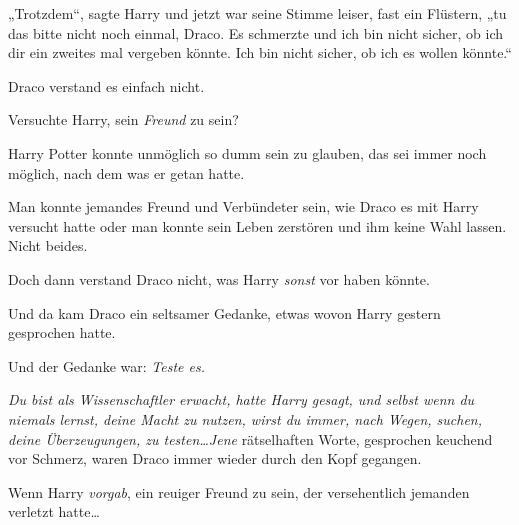 „Trotzdem“, sagte Harry und jetzt war seine Stimme leiser, fast ein Flüstern, „tu das bitte nicht noch einmal, Draco. Es schmerzte und ich bin nicht sicher, ob ich dir ein zweites mal vergeben könnte. Ich bin nicht sicher, ob ich es wollen könnte.“

Draco verstand es einfach nicht.

Versuchte Harry, sein \emph{Freund} zu sein?

Harry Potter konnte unmöglich so dumm sein zu glauben, das sei immer noch möglich, nach dem was er getan hatte.

Man konnte jemandes Freund und Verbündeter sein, wie Draco es mit Harry versucht hatte oder man konnte sein Leben zerstören und ihm keine Wahl lassen. Nicht beides.

Doch dann verstand Draco nicht, was Harry \emph{sonst} vor haben könnte.

Und da kam Draco ein seltsamer Gedanke, etwas wovon Harry gestern gesprochen hatte.

Und der Gedanke war: \emph{Teste es.}

\emph{Du bist als Wissenschaftler erwacht, hatte Harry gesagt, und selbst wenn du niemals lernst, deine Macht zu nutzen, wirst du immer, nach Wegen, suchen, deine Überzeugungen, zu testen…Jene} rätselhaften Worte, gesprochen keuchend vor Schmerz, waren Draco immer wieder durch den Kopf gegangen.

Wenn Harry \emph{vorgab}, ein reuiger Freund zu sein, der versehentlich jemanden verletzt hatte…

